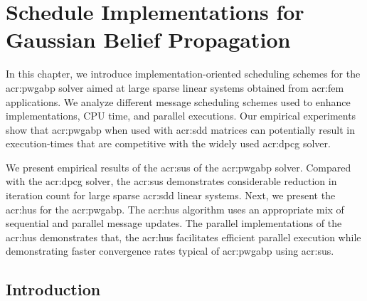 \graphicspath{{./figs/Chp-PWGaBP/}}


\chapter{Schedule Implementations for Gaussian Belief Propagation}


\label{chp:PW-GaBP}
In this chapter, we introduce implementation-oriented scheduling schemes for the \gls{acr:pwgabp} solver aimed at large sparse linear systems obtained from \gls{acr:fem} applications.
We analyze different message scheduling schemes used to enhance implementations, CPU time, and parallel executions.
Our empirical experiments show that \gls{acr:pwgabp} when used with \gls{acr:sdd} matrices can potentially result in execution-times that are competitive with the widely used \gls{acr:dpcg} solver.


We present empirical results of the \gls{acr:sus} of the \gls{acr:pwgabp} solver.
Compared with the \gls{acr:dpcg} solver, the \gls{acr:sus} demonstrates considerable reduction in iteration count for large sparse \gls{acr:sdd} linear systems.
Next, we present the \gls{acr:hus} for the \gls{acr:pwgabp}.
The \gls{acr:hus} algorithm uses an appropriate mix of sequential and parallel message updates.
The parallel implementations of the \gls{acr:hus} demonstrates that, the \gls{acr:hus} facilitates efficient parallel execution while demonstrating faster convergence rates typical of \gls{acr:pwgabp} using \gls{acr:sus}.


\section{Introduction}

